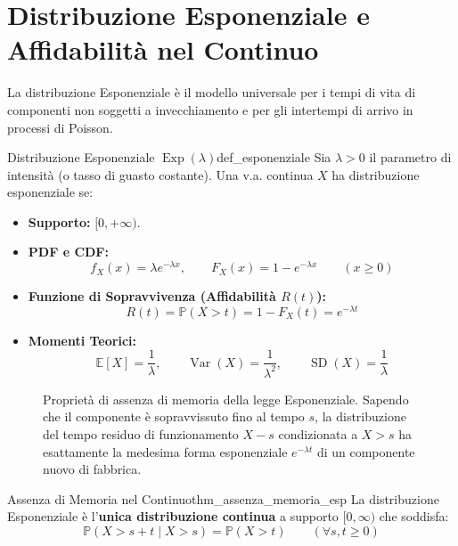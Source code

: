\section{Distribuzione Esponenziale e Affidabilità nel Continuo}
\label{sec:esponenziale}

La distribuzione Esponenziale è il modello universale per i tempi di vita di componenti non soggetti a invecchiamento e per gli intertempi di arrivo in processi di Poisson.

\begin{definizione}{Distribuzione Esponenziale $\operatorname{Exp}(\lambda)$}{def_esponenziale}
Sia $\lambda > 0$ il parametro di intensità (o tasso di guasto costante). Una v.a. continua $X$ ha distribuzione esponenziale se:
\begin{itemize}
    \item \textbf{Supporto:} $[0, +\infty)$.
    \item \textbf{PDF e CDF:}
    \begin{equation}
        f_X(x) = \lambda e^{-\lambda x}, \qquad F_X(x) = 1 - e^{-\lambda x} \qquad (x \ge 0)
    \end{equation}
    \item \textbf{Funzione di Sopravvivenza (Affidabilità $R(t)$):}
    \begin{equation}
        R(t) = \mathbb{P}(X > t) = 1 - F_X(t) = e^{-\lambda t}
    \end{equation}
    \item \textbf{Momenti Teorici:}
    \begin{equation}
        \mathbb{E}[X] = \frac{1}{\lambda}, \qquad \operatorname{Var}(X) = \frac{1}{\lambda^2}, \qquad \operatorname{SD}(X) = \frac{1}{\lambda}
    \end{equation}
\end{itemize}
\end{definizione}

\begin{figure}[htbp]
    \centering
    
    \caption{Proprietà di assenza di memoria della legge Esponenziale. Sapendo che il componente è sopravvissuto fino al tempo $s$, la distribuzione del tempo residuo di funzionamento $X - s$ condizionata a $X > s$ ha esattamente la medesima forma esponenziale $e^{-\lambda t}$ di un componente nuovo di fabbrica.}
    \label{fig:esponenziale_assenza_memoria}
\end{figure}

\begin{teorema}{Assenza di Memoria nel Continuo}{thm_assenza_memoria_esp}
La distribuzione Esponenziale è l'\textbf{unica distribuzione continua} a supporto $[0, \infty)$ che soddisfa:
\begin{equation}
    \mathbb{P}(X > s + t \mid X > s) = \mathbb{P}(X > t) \qquad (\forall s, t \ge 0)
\end{equation}
\end{teorema}

